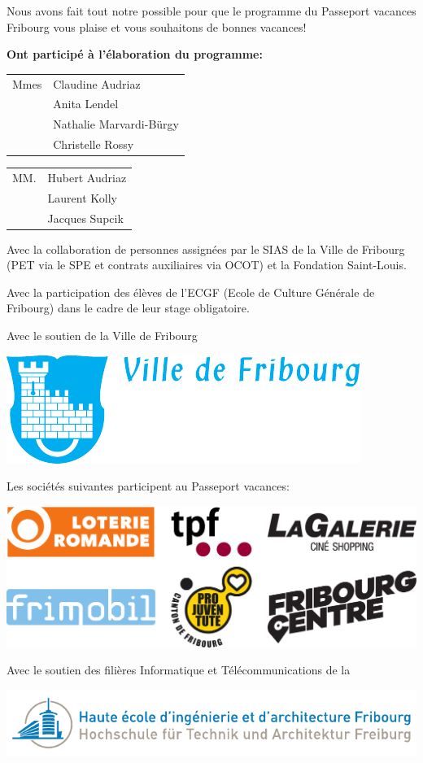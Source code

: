 \cleardoublepage
Nous avons fait tout notre possible pour que le  programme du Passeport vacances Fribourg vous plaise et vous
souhaitons de bonnes vacances!

\textbf{Ont participé à l'élaboration du programme:}

\begin{tabular}{p{1.6cm} l}
Mmes & Claudine Audriaz \\
& Anita Lendel \\
& Nathalie Marvardi-Bürgy \\
& Christelle Rossy \\
\end{tabular}

\begin{tabular}{p{1.6cm} l}
	MM. & Hubert Audriaz \\
	& Laurent Kolly \\
	& Jacques Supcik \\
\end{tabular}

Avec la collaboration de personnes assignées par le SIAS de la Ville de Fribourg (PET via le SPE et contrats
auxiliaires via OCOT) et la Fondation Saint-Louis.

Avec la participation des élèves de l'ECGF (Ecole de Culture Générale de Fribourg) dans le cadre de leur stage
obligatoire.

{\centering
	{\LARGE Avec le soutien de la Ville de Fribourg}

	\includegraphics[width=.4\textwidth]{fig/ville.pdf}
	\vfill
	\par

	{\LARGE Les sociétés suivantes participent au Passeport vacances:}

	\includegraphics[width=.8\textwidth]{fig/pub0.pdf}
	\vfill
	\par

    \vspace*{5mm}
	{\LARGE Avec le soutien des filières Informatique et Télécommunications de la}

	\includegraphics[width=.8\textwidth]{fig/heiafr.pdf}
	\par
}
